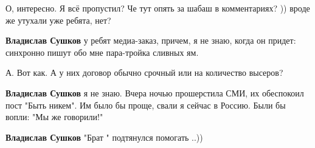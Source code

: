 \begin{itemize}
\begin{itemize}
\end{itemize}

 

О, интересно. Я всё пропустил? Че тут опять за шабаш в комментариях? )) вроде
же утухали уже ребята, нет?

\begin{itemize}
 
\textbf{Владислав Сушков} у ребят медиа-заказ, причем, я не знаю, когда он придет: синхронно пишут обо мне пара-тройка сливных ям.

 
А. Вот как. А у них договор обычно срочный или на количество высеров?

 
\textbf{Владислав Сушков} я не знаю. Вчера ночью прошерстила СМИ, их обеспокоил пост "Быть никем". Им было бы проще, свали я сейчас в Россию. Были бы вопли: "Мы же говорили!"

 
\textbf{Владислав Сушков} "Брат " подтянулся помогать ..))

 

\end{itemize}
\end{itemize}

